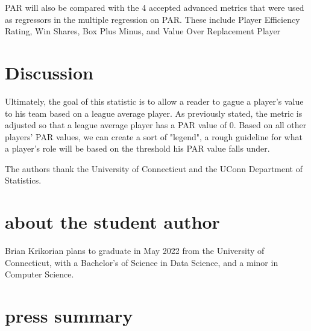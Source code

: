 \documentclass[12pt]{article}
\begin{document}
PAR will also be compared with the 4 accepted advanced metrics that were used as regressors in the multiple 
regression on PAR. These include Player Efficiency Rating, Win Shares, Box Plus Minus, and Value Over 
Replacement Player

\section{Discussion}
Ultimately, the goal of this statistic is to allow a reader to gague a player's value to his team based on a league 
average player. 
As previously stated, the metric is adjusted so that a league average player has a PAR value of 0. Based on all other 
players' PAR values, we can create a sort of "legend", a rough guideline for what a player's role will be based on the 
threshold his PAR 
value falls under.


%
The authors thank the University of Connecticut and the UConn Department of Statistics.






\section*{about the student author}
Brian Krikorian plans to graduate in May 2022 from the University of Connecticut, with a Bachelor's of Science in Data Science, and a minor in Computer Science.

\section*{press summary}
\end{document}
